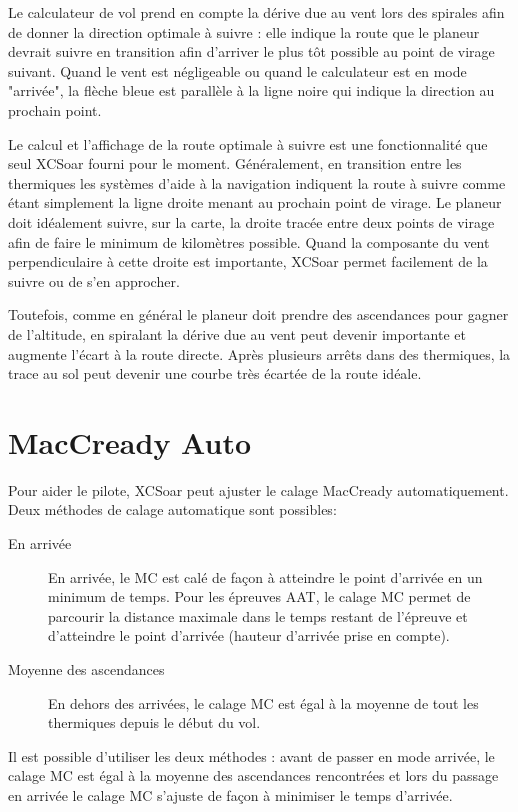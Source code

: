 Le calculateur de vol prend en compte la dérive due au vent lors des spirales afin de donner la direction optimale à suivre : elle indique la route que le planeur devrait suivre en transition afin d'arriver le plus tôt possible au point de virage suivant. Quand le vent est négligeable ou quand le calculateur est en mode "arrivée", la flèche bleue est parallèle à la ligne noire qui indique la direction au prochain point.

Le calcul et l'affichage de la route optimale à suivre est une fonctionnalité que seul XCSoar fourni pour le moment. Généralement, en transition entre les thermiques les systèmes d'aide à la navigation indiquent la route à suivre comme étant simplement la ligne droite menant au prochain point de virage. Le planeur doit idéalement suivre, sur la carte, la droite tracée entre deux points de virage afin de faire le minimum de kilomètres possible. Quand la composante du vent perpendiculaire à cette droite est importante, XCSoar permet facilement de la suivre ou de s'en approcher.

Toutefois, comme en général le planeur doit prendre des ascendances pour gagner de l'altitude, en spiralant la dérive due au vent peut devenir importante et augmente l'écart à la route directe. Après plusieurs arrêts dans des thermiques, la trace au sol peut devenir une courbe très écartée de la route idéale.

\section{MacCready Auto}\label{sec:auto-maccready}

Pour aider le pilote, XCSoar peut ajuster le calage MacCready automatiquement. Deux méthodes de calage automatique sont possibles:
\begin{description}
\item[En arrivée]  En arrivée, le MC est calé de façon à atteindre le point d'arrivée en un minimum de temps. Pour les épreuves AAT, le calage MC permet de parcourir la distance maximale dans le temps restant de l'épreuve et d'atteindre le point d'arrivée (hauteur d'arrivée prise en compte).
\item[Moyenne des ascendances] En dehors des arrivées, le calage MC est égal à la moyenne de tout les thermiques depuis le début du vol.
\end{description}
Il est possible d'utiliser les deux méthodes : avant de passer en mode arrivée, le calage MC est égal à la moyenne des ascendances rencontrées et lors du passage en arrivée le calage MC s'ajuste de façon à minimiser le temps d'arrivée.


